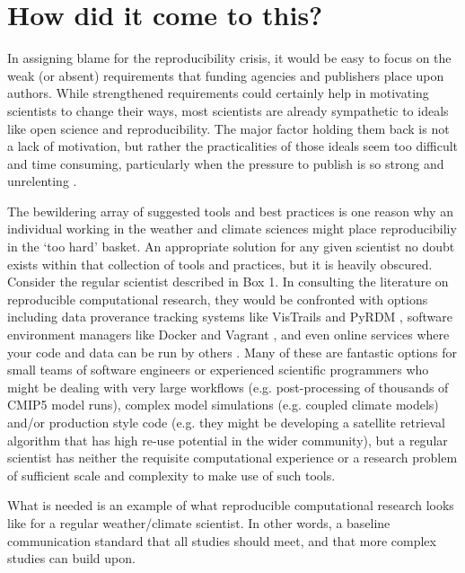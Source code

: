 \section{How did it come to this?}

In assigning blame for the reproducibility crisis, it would be easy to focus on the weak (or absent) requirements that funding agencies and publishers place upon authors. While strengthened requirements could certainly help in motivating scientists to change their ways, most scientists are already sympathetic to ideals like open science and reproducibility. The major factor holding them back is not a lack of motivation, but rather the practicalities of those ideals seem too difficult and time consuming, particularly when the pressure to publish is so strong and unrelenting \citep[e.g.][]{Stodden2010}. 

The bewildering array of suggested tools and best practices is one reason why an individual working in the weather and climate sciences might place reproducibiliy in the `too hard' basket. An appropriate solution for any given scientist no doubt exists within that collection of tools and practices, but it is heavily obscured. Consider the regular scientist described in Box 1. In consulting the literature on reproducible computational research, they would be confronted with options including data proverance tracking systems like VisTrails \citep{Freire2012} and PyRDM \citep{Jacobs2014}, software environment managers like Docker and Vagrant \citep{Stodden2014}, and even online services where your code and data can be run by others \citep{Stodden2012a}. Many of these are fantastic options for small teams of software engineers or experienced scientific programmers who might be dealing with very large workflows (e.g. post-processing of thousands of CMIP5 model runs), complex model simulations (e.g. coupled climate models) and/or production style code (e.g. they might be developing a satellite retrieval algorithm that has high re-use potential in the wider community), but a regular scientist has neither the requisite computational experience or a research problem of sufficient scale and complexity to make use of such tools.

What is needed is an example of what reproducible computational research looks like for a regular weather/climate scientist. In other words, a baseline communication standard that all studies should meet, and that more complex studies can build upon.